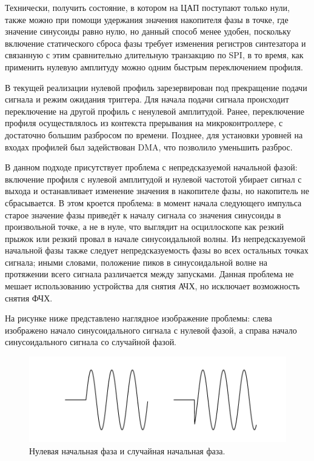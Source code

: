 \documentclass[rusmathsym, eqnumwithinsec, amspack, hyperref]{bomgost}
\begin{document}
Технически, получить состояние, в котором на ЦАП поступают только нули, также можно при помощи удержания значения накопителя фазы в точке, где значение синусоиды равно нулю, но данный способ менее удобен, поскольку включение статического сброса фазы требует изменения регистров синтезатора и связанную с этим сравнительно длительную транзакцию по SPI, в то время, как применить нулевую амплитуду можно одним быстрым переключением профиля.

В текущей реализации нулевой профиль зарезервирован под прекращение подачи сигнала и режим ожидания триггера. Для начала подачи сигнала происходит переключение на другой профиль с ненулевой амплитудой. Ранее, переключение профиля осуществлялось из контекста прерывания на микроконтроллере, с достаточно большим разбросом по времени. Позднее, для установки уровней на входах профилей был задействован DMA, что позволило уменьшить разброс.

В данном подходе присутствует проблема с непредсказуемой начальной фазой: включение профиля с нулевой амплитудой и нулевой частотой убирает сигнал с выхода и останавливает изменение значения в накопителе фазы, но накопитель не сбрасывается. В этом кроется проблема: в момент начала следующего импульса старое значение фазы приведёт к началу сигнала со значения синусоиды в произвольной точке, а не в нуле, что выглядит на осциллоскопе как резкий прыжок или резкий провал в начале синусоидальной волны. Из непредсказуемой начальной фазы также следует непредсказуемость фазы во всех остальных точках сигнала; иными словами, положение пиков в синусоидальной волне на протяжении всего сигнала различается между запусками. Данная проблема не мешает использованию устройства для снятия АЧХ, но исключает возможность снятия ФЧХ.

На рисунке ниже представлено наглядное изображение проблемы: слева изображено начало синусоидального сигнала с нулевой фазой, а справа начало синусоидального сигнала со случайной фазой.

%
%
\begin{gostfigure}
\begin{figure}[H]
\centering
\includegraphics{data/random_start_phase.pdf}
\caption{Нулевая начальная фаза и случайная начальная фаза.}
\label{fig:random_start_phase}
\end{figure}
\end{gostfigure}
\end{document}
